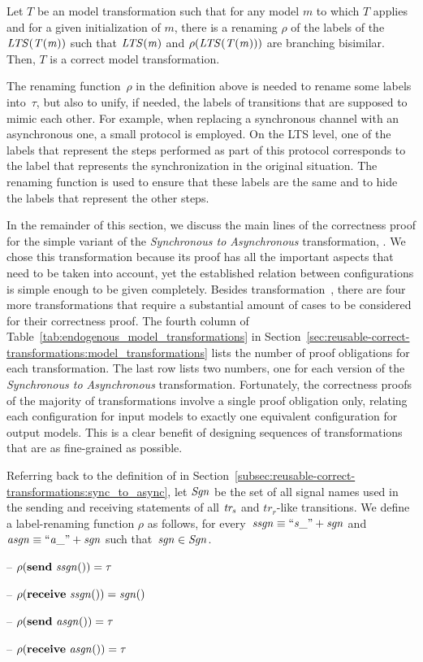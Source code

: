 \begin{definition}
Let $T$ be an \SLCO model transformation such that for any \SLCO model $m$ to which $T$ applies and for a given initialization of $m$, there is a renaming $\rho$ of the labels of the $\it{LTS}(T(m))$ such that $\it{LTS}(m)$ and $\rho(\it{LTS}(T(m)))$ are branching bisimilar.
Then, $T$ is a correct model transformation.
\end{definition}

The renaming function~$\rho$ in the definition above is needed to rename some labels into~$\tau$, but also to unify, if needed, the labels of transitions that are supposed to mimic each other.
For example, when replacing a synchronous channel with an asynchronous one, a small protocol is employed.
On the LTS level, one of the labels that represent the steps performed as part of this protocol corresponds to the label that represents the synchronization in the original situation.
The renaming function is used to ensure that these labels are the same and to hide the labels that represent the other steps.

In the remainder of this section, we discuss the main lines of the correctness proof for the simple variant of the \emph{Synchronous to Asynchronous} transformation, \TSim.
We chose this transformation because its proof has all the important aspects that need to be taken into account, yet the established relation between configurations is simple enough to be given completely.
Besides transformation~\TSim, there are four more transformations that require a substantial amount of cases to be considered for their correctness proof.
The fourth column of Table~\ref{tab:endogenous_model_transformations} in Section~\ref{sec:reusable-correct-transformations:model_transformations} lists the number of proof obligations for each transformation.
The last row lists two numbers, one for each version of the \emph{Synchronous to Asynchronous} transformation.
Fortunately, the correctness proofs of the majority of transformations involve a single proof obligation only, relating each configuration for input models to exactly one equivalent configuration for output models.
This is a clear benefit of designing sequences of transformations that are as fine-grained as possible.

Referring back to the definition of \TSim in Section~\ref{subsec:reusable-correct-transformations:sync_to_async}, let $\it{Sgn}$ be the set of all signal names used in the sending and receiving statements of all $\it{tr_s}$ and $tr_r$-like transitions.
We define a label-renaming function $\rho$ as follows, for every~$\it{ssgn} \equiv ``s\_" + \it{sgn}$ and~$\it{asgn} \equiv ``a\_" + \it{sgn}$ such that~$\it{sgn}\in \it{Sgn}$.
%
\begin{itemize*}
\item [--] $\rho(\textbf{send}~\it{ssgn()}) = \tau$
\item [--] $\rho(\textbf{receive}~\it{ssgn()}) = \it{sgn()}$
\item [--] $\rho(\textbf{send}~\it{asgn()}) = \tau$
\item [--] $\rho(\textbf{receive}~\it{asgn()}) = \tau$
\end{itemize*}

